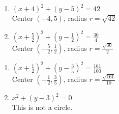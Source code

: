 \begin{multicols}{2}
\begin{enumerate}
\setcounter{enumi}{\value{HW}}

\item $(x+4)^2 + (y-5)^2 = 42$ \\
Center $(-4,5)$, radius $r = \sqrt{42}$

\item $\left(x + \frac{5}{2}\right)^2 + \left(y - \frac{1}{2}\right)^2 = \frac{30}{4}$ \\
Center $\left( -\frac{5}{2}, \frac{1}{2}\right)$, radius $r = \frac{\sqrt{30}}{2}$

\setcounter{HW}{\value{enumi}}
\end{enumerate}
\end{multicols}

\begin{multicols}{2}
\begin{enumerate}
\setcounter{enumi}{\value{HW}}

\item $\left(x + \frac{1}{2}\right)^{2} + \left(y - \frac{3}{5}\right)^{2} = \frac{161}{100}$\\
Center $\left(-\frac{1}{2}, \frac{3}{5}\right)$, radius $r = \frac{\sqrt{161}}{10}$

\item $x^{2} + (y - 3)^{2} = 0$\\
This is not a circle.

\setcounter{HW}{\value{enumi}}
\end{enumerate}
\end{multicols}

